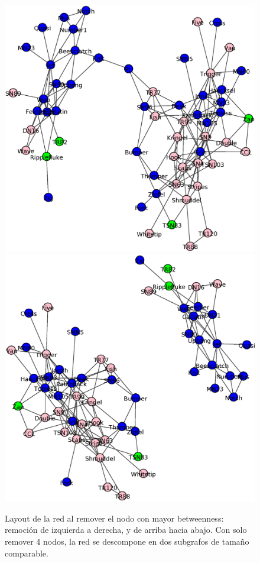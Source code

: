 \begin{figure}
\includegraphics[scale = 0.28]{figuras/Parte_c2} 
\includegraphics[scale = 0.28]{figuras/Parte_c3} 
\caption{Layout de la red al remover el nodo con mayor betweenness: remoción de izquierda a derecha, y de arriba hacia abajo. Con solo remover 4 nodos, la red se descompone en dos subgrafos de tamaño comparable.}
\label{fig:Betweenness}
\end{figure}

